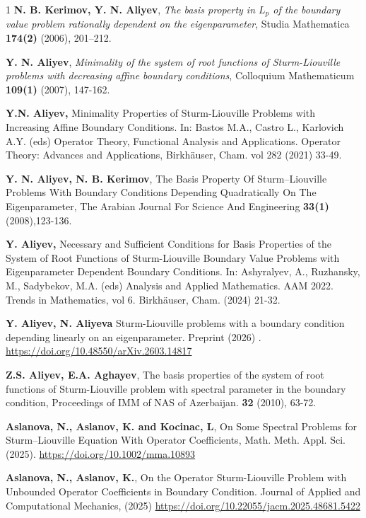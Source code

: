 \documentclass[pdflatex,sn-mathphys-num]{sn-jnl}%
\theoremstyle{thmstyleone}%
\theoremstyle{thmstyletwo}%
\theoremstyle{thmstylethree}%
\theoremstyle{definition}
\theoremstyle{remark}
\numberwithin{equation}{section}
\begin{document}
\begin{thebibliography}{1}
\textbf{N. B. Kerimov, Y. N. Aliyev}, \textit{The basis property in $L_p$ of the boundary value problem rationally dependent on the eigenparameter}, Studia Mathematica \textbf{174(2)} (2006), 201--212.

\textbf{Y. N. Aliyev}, \textit{Minimality of the system of root functions of Sturm-Liouville problems with decreasing affine boundary conditions}, Colloquium Mathematicum \textbf{109(1)}
(2007), 147-162.

\textbf{Y.N. Aliyev,} Minimality Properties of Sturm-Liouville Problems with Increasing Affine Boundary Conditions. In: Bastos M.A., Castro L., Karlovich A.Y. (eds) Operator Theory, Functional Analysis and Applications. Operator Theory: Advances and Applications, Birkhäuser, Cham.  vol 282 (2021) 33-49.

\textbf{Y. N. Aliyev, N. B. Kerimov}, The Basis Property Of Sturm–Liouville Problems With Boundary Conditions Depending Quadratically On The Eigenparameter, The Arabian Journal For Science And Engineering  \textbf{33(1)} (2008),123-136.

\textbf{Y. Aliyev,} Necessary and Sufficient Conditions for Basis Properties of the System of Root Functions of Sturm-Liouville Boundary Value Problems with Eigenparameter Dependent Boundary Conditions. In: Ashyralyev, A., Ruzhansky, M., Sadybekov, M.A. (eds)
 Analysis and Applied Mathematics. AAM 2022. Trends in Mathematics, vol 6. Birkhäuser, Cham.  (2024) 21-32.

\textbf{Y. Aliyev, N. Aliyeva} Sturm-Liouville problems with a boundary condition depending linearly on an eigenparameter. Preprint (2026) .
\url{https://doi.org/10.48550/arXiv.2603.14817}


\textbf{Z.S. Aliyev, E.A. Aghayev}, The basis properties of the system of root functions of Sturm-Liouville problem with spectral parameter in the boundary condition, Proceedings of IMM of NAS of Azerbaijan. \textbf{32} (2010), 63-72.

\textbf{Aslanova, N., Aslanov, K. and Kocinac, L}, On Some Spectral Problems for Sturm–Liouville Equation With Operator Coefficients, Math. Meth. Appl. Sci. \textbf{} (2025). \url{https://doi.org/10.1002/mma.10893}

\textbf{Aslanova, N., Aslanov, K.}, On the Operator Sturm-Liouville Problem with Unbounded Operator Coefficients in Boundary Condition. Journal of Applied and Computational Mechanics, (2025) \url{https://doi.org/10.22055/jacm.2025.48681.5422}


\end{thebibliography}
\end{document}
